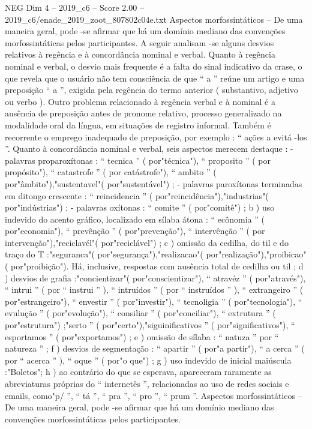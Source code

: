 \begin{textsample}{NEG Dim 4 – 2019\_c6 – Score 2.00 – 2019\_c6/enade\_2019\_zoot\_807802c04e.txt}
Aspectos morfossintáticos – De uma maneira geral, pode -se afirmar que há um domínio mediano das convenções morfossintáticas pelos participantes.
A seguir analisam -se alguns desvios relativos à regência e à concordância nominal e verbal.
Quanto à regência nominal e verbal, o desvio mais frequente é a falta do sinal indicativo da crase, o que revela que o usuário não tem consciência de que “ a ” reúne um artigo e uma preposição “ a ”, exigida pela regência do termo anterior ( substantivo, adjetivo ou verbo ).
Outro problema relacionado à regência verbal e à nominal é a ausência de preposição antes de pronome relativo, processo generalizado na modalidade oral da língua, em situações de registro informal.
Também é recorrente o emprego inadequado de preposição, por exemplo : “ ações a evitá -los ”.
Quanto à concordância nominal e verbal, seis aspectos merecem destaque : - palavras proparoxítonas : “ tecnica ” ( por"técnica"), “ proposito ” ( por propósito"), “ catastrofe ” ( por catástrofe"), “ ambito ” ( por"âmbito"),"sustentavel"( por"sustentável") ; - palavras paroxítonas terminadas em ditongo crescente : “ reincidencia ” ( por"reincidência"),"industrias"( por"indústrias") ; - palavras oxítonas : “ comite ” ( por"comitê") ; b ) uso indevido do acento gráfico, localizado em sílaba átona : “ ecônomia ” ( por"economia"), “ prevênção ” ( por"prevenção"), “ intervênção ” ( por intervenção"),"reciclavél"( por"reciclável") ; c ) omissão da cedilha, do til e do traço do T :"seguranca"( por"segurança"),"realizacao"( por"realização"),"proibicao"( por"proibição").
Há, inclusive, respostas com ausência total de cedilha ou til ; d ) desvios de grafia :"concientizar"( por"conscientizar"), “ atravéz ” ( por"através"), “ intrui ” ( por “ instrui ” ), “ intruídos ” ( por “ instruídos ” ), “ extrangeiro ” ( por"estrangeiro"), “ envestir ” ( por"investir"), “ tecnoligia ” ( por"tecnologia"), “ evulução ” ( por"evolução"), “ consiliar ” ( por"conciliar"), “ extrutura ” ( por"estrutura") ;"serto ” ( por"certo"),"siguinificativos ” ( por"significativos"), “ esportamos ” ( por"exportamos") ; e ) omissão de sílaba : “ natuza ” por “ natureza ” ; f ) desvios de segmentação : “ apartir ” ( por"a partir"), “ a cerca ” ( por “ acerca ” ), “ oque ” ( por"o que") ; g ) uso indevido de inicial maiúscula :"Boletos"; h ) ao contrário do que se esperava, apareceram raramente as abreviaturas próprias do “ internetês ”, relacionadas ao uso de redes sociais e emails, como"p/ ”, “ tá ”, “ pra ”, “ pro ”, “ prum ”.
Aspectos morfossintáticos – De uma maneira geral, pode -se afirmar que há um domínio mediano das convenções morfossintáticas pelos participantes.

\end{textsample}
